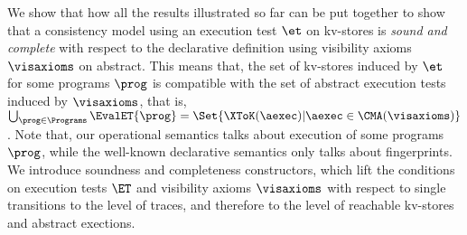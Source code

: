 We show that how all the results illustrated so far 
can be put together to show that a consistency model 
using an execution test \( \et \) on kv-stores
is \emph{sound and complete} with respect to 
the declarative definition using visibility axioms \( \visaxioms \) on abstract.
This means that,
the set of kv-stores induced by \( \et \) for some programs \( \prog \) is compatible with
the set of abstract execution tests induced by \( \visaxioms \),
that is,
\( 
    \bigcup_{\prog \in \Programs} \EvalET{\prog} = \Set{ \XToK(\aexec)
                | \aexec \in \CMA(\visaxioms) } \).
Note that, our operational semantics talks about execution of some programs \( \prog \),
while the well-known declarative semantics only talks about fingerprints.
We introduce soundness and completeness constructors, which lift the conditions 
on execution tests \( \ET \) and visibility axioms \( \visaxioms \) with respect to single transitions
to the level of traces, and therefore to the level of reachable kv-stores and abstract exections.

